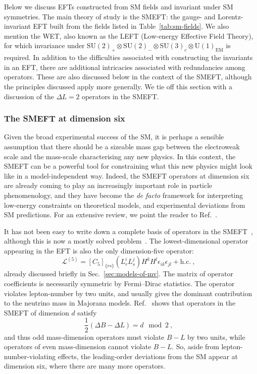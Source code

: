 Below we discuss EFTs constructed from SM fields and invariant under SM
symmetries. The main theory of study is the SMEFT: the gauge- and
Lorentz-invariant EFT built from the fields listed in Table~\ref{tab:sm-fields}.
We also mention the WET, also known as the LEFT (Low-energy Effective Field
Theory), for which invariance under
$\mathrm{SU}(2)_{+} \otimes \mathrm{SU}(2)_{-} \otimes \mathrm{SU}(3)_{c} \otimes \mathrm{U}(1)_{\text{EM}}$
is required. In addition to the difficulties associated with constructing the
invariants in an EFT, there are additional intricacies associated with
redundancies among operators. These are also discussed below in the context of
the SMEFT, although the principles discussed apply more generally. We tie off
this section with a discussion of the $\Delta L = 2$ operators in the SMEFT.

\subsubsection{The SMEFT at dimension six}

Given the broad experimental success of the SM, it is perhaps a sensible
assumption that there should be a sizeable mass gap between the electroweak
scale and the mass-scale characterising any new physics. In this context, the
SMEFT can be a powerful tool for constraining what this new physics might look
like in a model-independent way. Indeed, the SMEFT operators at dimension six
are already coming to play an increasingly important role in particle
phenomenology, and they have become the \textit{de facto} framework for
interpreting low-energy constraints on theoretical models, and experimental
deviations from SM predictions. For an extensive review, we point the reader to
Ref.~\cite{Brivio:2017vri}.

It has not been easy to write down a complete basis of operators in the
SMEFT~\cite{}, although this is now a mostly solved problem~\cite{}. The
lowest-dimensional operator appearing in the EFT is also the only dimension-five
operator:
\begin{equation}
  \mathscr{L}^{(5)} = [C_{5}]_{\{rs\}} (L^{i}_{r} L^{j}_{s}) H^{k} H^{l} \epsilon_{ik} \epsilon_{jl} + \text{h.c.} \ ,
\end{equation}
already discussed briefly in Sec.~\ref{sec:models-of-mv}. The matrix of operator
coefficients is necessarily symmetric by Fermi--Dirac statistics. The operator
violates lepton-number by two units, and usually gives the dominant contribution
to the neutrino mass in Majorana models. Ref.~\cite{Kobach:2016ami} shows that
operators in the SMEFT of dimension $d$ satisfy
\begin{equation}
  \frac{1}{2} (\Delta B - \Delta L) = d \mod 2 \ ,
\end{equation}
and thus odd mass-dimension operators must violate $B - L$ by two units, while
operators of even mass-dimension cannot violate $B - L$. So, aside from
lepton-number-violating effects, the leading-order deviations from the SM appear
at dimension six, where there are many more operators.

